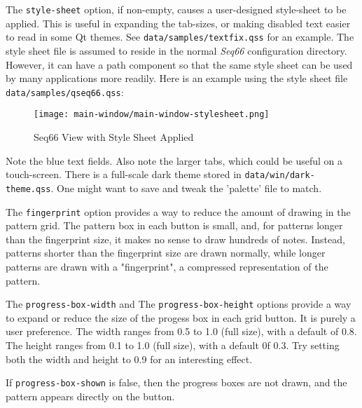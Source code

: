    The \texttt{style-sheet} option, if non-empty, causes a user-designed
   style-sheet to be applied.  This is useful in expanding the tab-sizes,
   or making disabled text easier to read in some Qt themes.
   See \texttt{data/samples/textfix.qss} for an example.
   The style sheet file is assumed to reside in the normal \textsl{Seq66}
   configuration directory.
   However, it can have a path component so that the same style sheet
   can be used by many applications more readily.
   Here is an example using the style sheet file
   \texttt{data/samples/qseq66.qss}:

\begin{figure}[H]
   \centering 
   \texttt{[image: main-window/main-window-stylesheet.png]}
   \caption{Seq66 View with Style Sheet Applied}
   \label{fig:view_with_style_sheet_applied}
\end{figure}

   Note the blue text fields. Also note the larger tabs, which could be useful
   on a touch-screen.
   There is a full-scale dark theme stored in
   \texttt{data/win/dark-theme.qss}.
   One might want to save and tweak the 'palette' file to match.

   The \texttt{fingerprint} option provides a way to reduce the amount of
   drawing in the pattern grid.  The pattern box in each button is small, and,
   for patterns longer than the fingerprint size, it makes no sense to draw
   hundreds of notes.  Instead, patterns shorter than the fingerprint size are
   drawn normally, while longer patterns are drawn with a "fingerprint", a
   compressed representation of the pattern.

   The \texttt{progress-box-width} and
   The \texttt{progress-box-height} options provide a way to expand or reduce
   the size of the progess box in each grid button.
   It is purely a user preference.
   The width ranges from 0.5 to 1.0 (full size), with a default of 0.8.
   The height ranges from 0.1 to 1.0 (full size), with a default 0f 0.3.
   Try setting both the width and height to 0.9 for an interesting effect.


   If  \texttt{progress-box-shown} is false, then the progress boxes are not
   drawn, and the pattern appears directly on the button.

